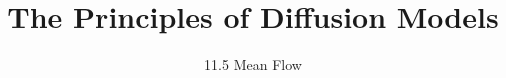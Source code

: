 
\title{The Principles of Diffusion Models}
\subtitle{11.5 Mean Flow}


\begin{frame}
    \titlepage
\end{frame}


